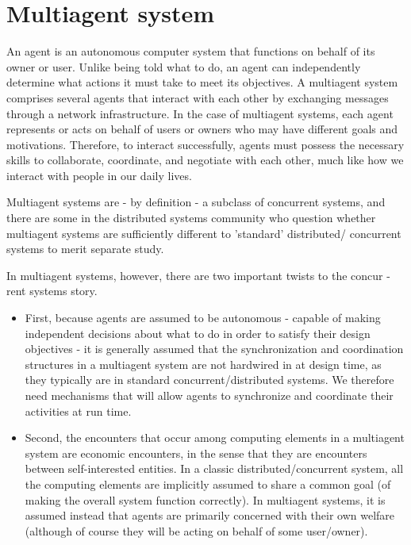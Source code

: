 
\section{Multiagent system}


An agent is an autonomous computer system that functions on behalf of its owner or user. Unlike being told what to do, an agent can independently determine what actions it must take to meet its objectives. A multiagent system comprises several agents that interact with each other by exchanging messages through a network infrastructure. In the case of multiagent systems, each agent represents or acts on behalf of users or owners who may have different goals and motivations. Therefore, to interact successfully, agents must possess the necessary skills to collaborate, coordinate, and negotiate with each other, much like how we interact with people in our daily lives.

Multiagent systems are - by definition - a subclass of concurrent
systems, and there are some in the distributed systems community who
question whether multiagent systems are sufficiently different to 'standard' distributed/
concurrent systems to merit separate study.

In multiagent systems, however, there are two important twists to the concur -
rent systems story. \cite{MultiAgent}
\begin{itemize}
  \item  First, because agents are assumed to be autonomous - capable of making
independent decisions about what to do in order to satisfy their design
objectives - it is generally assumed that the synchronization and coordination
structures in a multiagent system are not hardwired in at design
time, as they typically are in standard concurrent/distributed systems.
We therefore need mechanisms that will allow agents to synchronize and
coordinate their activities at run time.
  \item  Second, the encounters that occur among computing elements in a multiagent
system are economic encounters, in the sense that they are encounters
between self-interested entities. In a classic distributed/concurrent system,
all the computing elements are implicitly assumed to share a common goal
(of making the overall system function correctly). In multiagent systems, it is
assumed instead that agents are primarily concerned with their own welfare
(although of course they will be acting on behalf of some user/owner).
\end{itemize}
